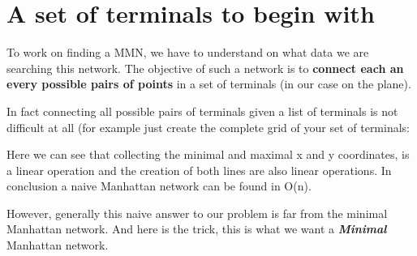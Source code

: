 \section{A set of terminals to begin with}%
To work on finding a MMN, we have to understand on what data we are searching this network. The objective of such a network is to \textbf{connect each an every possible pairs of points} in a set of terminals (in our case on the plane).

In fact connecting all possible pairs of terminals given a list of terminals is not difficult at all (for example just create the complete grid of your set of terminals: 



Here we can see that collecting the minimal and maximal x and y coordinates, is a linear operation and the creation of both lines are also linear operations. In conclusion a naive Manhattan network can be found in O(n). 

However, generally this naive answer to our problem is far from the minimal Manhattan network. And here is the trick, this is what we want a \textbf{\emph{Minimal}} Manhattan network.
